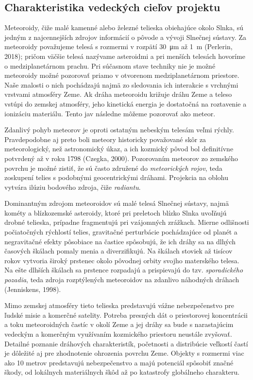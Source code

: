 \subsection{Charakteristika vedeckých cieľov
projektu}\label{charakteristika-vedeckuxfdch-cieux13eov-projektu}

Meteoroidy, čiže malé kamenné alebo železné telieska obiehajúce okolo
Slnka, sú jedným z najcennejších zdrojov informácií o pôvode a vývoji
Slnečnej sústavy. Za meteoroidy považujeme telesá s rozmermi v rozpätí
\SI{30}{\micro\metre} až \SI{1}{\metre} (Perlerin, 2018); pričom väčšie
telesá nazývame asteroidmi a pri menších telesách hovoríme o
medziplanetárnom prachu. Pri súčasnom stave techniky nie je možné
meteoroidy možné pozorovať priamo v otvorenom medziplanetárnom
priestore. Naše znalosti o nich pochádzajú najmä zo sledovania ich
interakcie s vrchnými vrstvami atmosféry Zeme. Ak dráha meteoroidu
križuje dráhu Zeme a teleso vstúpi do zemskej atmosféry, jeho kinetická
energia je dostatočná na roztavenie a ionizáciu materiálu. Tento jav
následne môžeme pozorovať ako meteor.

Zdanlivý pohyb meteorov je oproti ostatným nebeským telesám veľmi
rýchly. Pravdepodobne aj preto boli meteory historicky považované skôr
za meteorologický, než astronomický úkaz, a ich kozmický pôvod bol
definitívne potvrdený až v roku 1798 (Czegka, 2000). Pozorovaním
meteorov zo zemského povrchu je možné zistiť, že sú často združené do
\emph{meteorických rojov}, teda zoskupení telies s podobnými
geocentrickými dráhami. Projekcia na oblohu vytvára ilúziu bodového
zdroja, čiže \emph{radiantu}.

Dominantným zdrojom meteoroidov sú malé telesá Slnečnej sústavy, najmä
kométy a blízkozemské asteroidy, ktoré pri preletoch blízko Slnka
uvoľňujú drobné telieska, prípadne fragmentujú pri vzájomných zrážkach.
Mierne odlišnosti počiatočných rýchlostí telies, gravitačné perturbácie
pochádzajúce od planét a negravitačné efekty pôsobiace na častice
spôsobujú, že ich dráhy sa na dlhých časových škálach pomaly menia a
diverzifikujú. Na škálach stoviek až tisícov rokov vytvoria široký
prstenec okolo pôvodnej orbity svojho materského telesa. Na ešte dlhších
škálach sa prstence rozpadajú a prispievajú do tzv. \emph{sporadického
pozadia}, teda zdroja rozptýlených meteoroidov na zdanlivo náhodných
dráhach (Jenniskens, 1998).

Mimo zemskej atmosféry tieto telieska predstavujú vážne nebezpečenstvo
pre ľudské misie a komerčné satelity. Potreba presných dát o
priestorovej koncentrácii a toku meteoroidných častíc v okolí Zeme a jej
dráhy sa bude s narastajúcim vedeckým a komerčným využívaním kozmického
priestoru neustále zvyšovať. Detailné poznanie dráhových charakteristík,
početnosti a distribúcie veľkostí častí je dôležité aj pre zhodnotenie
ohrozenia povrchu Zeme. Objekty s rozmermi viac ako 10 metrov
predstavujú nebezpečenstvo a majú potenciál spôsobiť značné škody, od
lokálnych materiálnych škôd až po katastrofy globálneho charakteru.

